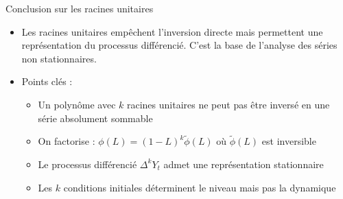 \documentclass[11pt,aspectratio=169]{beamer}
\begin{document}
\begin{frame}{Conclusion sur les racines unitaires}

\begin{itemize}

\item Les racines unitaires empêchent l'inversion directe mais permettent une représentation du processus différencié. C'est la base de l'analyse des séries non stationnaires.\newline

\item Points clés :
  \begin{itemize}
    \item Un polynôme avec $k$ racines unitaires ne peut pas être inversé en une série absolument sommable\newline
    \item On factorise : $\phi(L) = (1-L)^k \tilde{\phi}(L)$ où $\tilde{\phi}(L)$ est inversible\newline
    \item Le processus différencié $\Delta^k Y_t$ admet une représentation stationnaire\newline
    \item Les $k$ conditions initiales déterminent le niveau mais pas la dynamique
  \end{itemize}

\end{itemize}

\end{frame}
\end{document}
